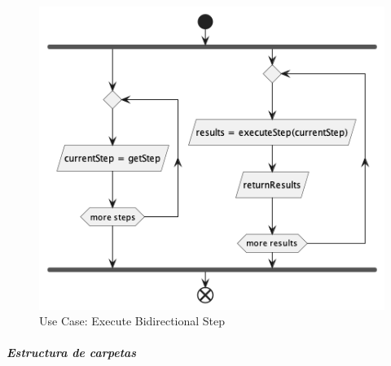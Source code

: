 \begin{figure}[H]
    \centering
    \includegraphics[height=0.2\textheight]{./part/Proyecto_ejecutivo/memoria_descriptiva/descripcionDelProyecto/client/uml/executeBidiStep}
    \caption{Use Case: Execute Bidirectional Step}\label{fig:Use Case-Execute Bidirectional Step}
\end{figure}

\subparagraph{Estructura de carpetas}







